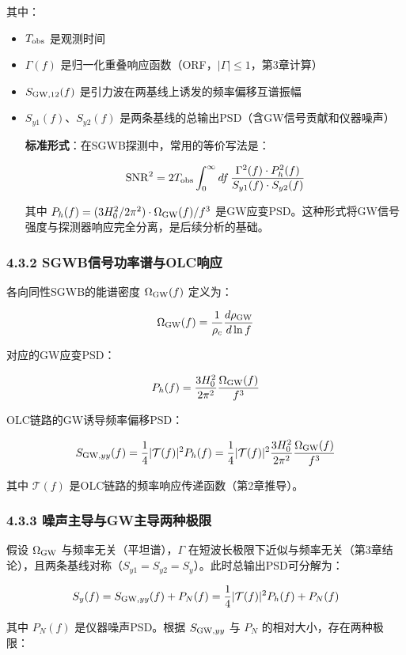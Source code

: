\documentclass[12pt,a4paper]{article}
\begin{document}
其中：
\begin{itemize}
  \item $T_{\rm obs}$ 是观测时间
  \item $\Gamma(f)$ 是归一化重叠响应函数（ORF，$|\Gamma| \leq 1$，第3章计算）
  \item $S_{{\rm GW},12}(f)$ 是引力波在两基线上诱发的频率偏移互谱振幅
  \item $S_{y1}(f)$、$S_{y2}(f)$ 是两条基线的总输出PSD（含GW信号贡献和仪器噪声）

\textbf{标准形式}：在SGWB探测中，常用的等价写法是：

$${\rm SNR}^2 = 2 T_{\rm obs} \int_0^\infty df\, \frac{\Gamma^2(f) \cdot P_h^2(f)}{S_{y1}(f) \cdot S_{y2}(f)}$$

其中 $P_h(f) = (3H_0^2/2\pi^2) \cdot \Omega_{\rm GW}(f)/f^3$ 是GW应变PSD。这种形式将GW信号强度与探测器响应完全分离，是后续分析的基础。

\end{itemize}
\subsubsection{4.3.2 SGWB信号功率谱与OLC响应}


各向同性SGWB的能谱密度 $\Omega_{\rm GW}(f)$ 定义为：

$$\Omega_{\rm GW}(f) = \frac{1}{\rho_c} \frac{d\rho_{\rm GW}}{d\ln f}$$

对应的GW应变PSD：

$$P_h(f) = \frac{3H_0^2}{2\pi^2} \frac{\Omega_{\rm GW}(f)}{f^3}$$

OLC链路的GW诱导频率偏移PSD：

$$S_{{\rm GW},yy}(f) = \frac{1}{4} |\mathcal{T}(f)|^2 P_h(f) = \frac{1}{4} |\mathcal{T}(f)|^2 \frac{3H_0^2}{2\pi^2} \frac{\Omega_{\rm GW}(f)}{f^3}$$

其中 $\mathcal{T}(f)$ 是OLC链路的频率响应传递函数（第2章推导）。

\subsubsection{4.3.3 噪声主导与GW主导两种极限}


假设 $\Omega_{\rm GW}$ 与频率无关（平坦谱），$\Gamma$ 在短波长极限下近似与频率无关（第3章结论），且两条基线对称（$S_{y1} = S_{y2} = S_y$）。此时总输出PSD可分解为：

$$S_y(f) = S_{{\rm GW},yy}(f) + P_N(f) = \frac{1}{4} |\mathcal{T}(f)|^2 P_h(f) + P_N(f)$$

其中 $P_N(f)$ 是仪器噪声PSD。根据 $S_{{\rm GW},yy}$ 与 $P_N$ 的相对大小，存在两种极限：
\end{document}
